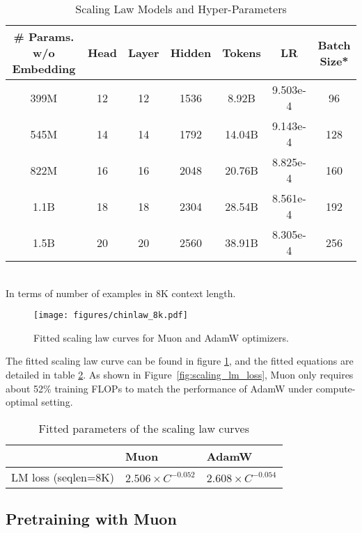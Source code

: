 \begin{table}[t]
\small
\centering
\caption{Scaling Law Models and Hyper-Parameters}
\label{tab:model-specs}
\begin{tabular}{c|c|c|c|c|c|c}
\toprule
\# Params. w/o Embedding & Head & Layer & Hidden & Tokens & LR & Batch Size* \\
\midrule
399M & 12 & 12 & 1536 & 8.92B  & 9.503e-4 & 96  \\
545M & 14 & 14 & 1792 & 14.04B & 9.143e-4 & 128 \\
822M & 16 & 16 & 2048 & 20.76B & 8.825e-4 & 160 \\
1.1B & 18 & 18 & 2304 & 28.54B & 8.561e-4 & 192 \\
1.5B & 20 & 20 & 2560 & 38.91B & 8.305e-4 & 256 \\
\bottomrule
\end{tabular}
\\ \footnotesize{\small *In terms of number of examples in 8K context length.} 
\end{table}


\begin{figure}[h]
    \centering
    \texttt{[image: figures/chinlaw\_8k.pdf]}
    \caption{Fitted scaling law curves for Muon and AdamW optimizers.}
    \label{fig:scaling_lm_loss_fitting}
\end{figure}

    
The fitted scaling law curve can be found in figure \ref{fig:scaling_lm_loss_fitting}, and the fitted equations are detailed in table \ref{tab:fit}. As shown in Figure~\ref{fig:scaling_lm_loss}, Muon only requires about 52\% training FLOPs to match the performance of AdamW under compute-optimal setting. 


\begin{table}
\centering
\caption{Fitted parameters of the scaling law curves}
\label{tab:fit}
\begin{tabular}{c|l|l}
\toprule
 & Muon & AdamW \\
\midrule
LM loss (seqlen=8K) & $2.506 \times C^{-0.052}$ & $2.608 \times C^{-0.054}$ \\
\bottomrule
\end{tabular}
\end{table}


\subsection{Pretraining with Muon}
\label{sec:exp:pretrain}

